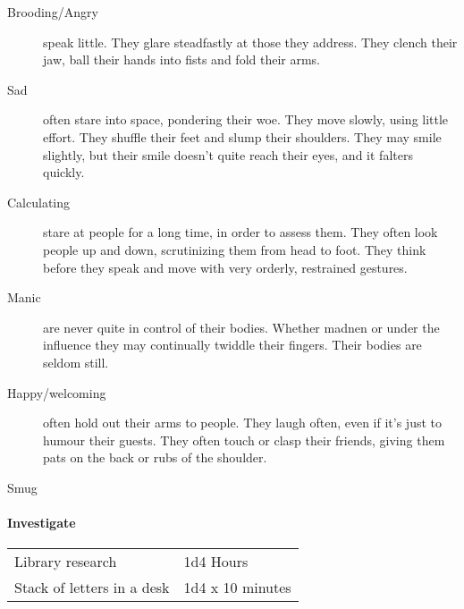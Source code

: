 \begin{description}
  \item[Brooding/Angry] speak little. They glare steadfastly at those they address. They clench their jaw, ball their hands into fists and fold their arms.
  \item[Sad] often stare into space, pondering their woe. They move slowly, using little effort. They shuffle their feet and slump their shoulders. They may smile slightly, but their smile doesn't quite reach their eyes, and it falters quickly.
  \item[Calculating] stare at people for a long time, in order to assess them. They often look people up and down, scrutinizing them from head to foot. They think before they speak and move with very orderly, restrained gestures.
  \item[Manic] are never quite in control of their bodies. Whether madnen or under the influence they may continually twiddle their fingers. Their bodies are seldom still.
  \item[Happy/welcoming] often hold out their arms to people. They laugh often, even if it's just to humour their guests. They often touch or clasp their friends, giving them pats on the back or rubs of the shoulder.
  \item[Smug]
\end{description}

\paragraph{Investigate}
\begin{tabular}{l l}
    Library research & 1d4 Hours\\
    Stack of letters in a desk & 1d4 x 10 minutes\\
\end{tabular}

